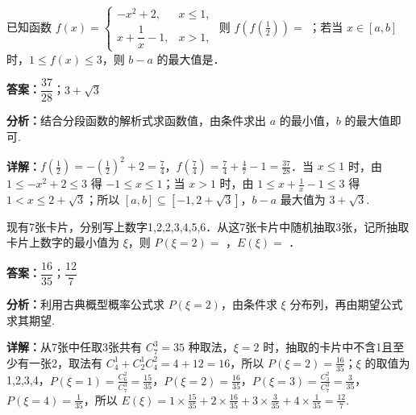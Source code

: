 \begin{question}[points=6]
已知函数 $f(x) = \begin{cases} -x^2+2, & x \le 1, \\ x+\dfrac{1}{x}-1, & x > 1, \end{cases}$ 则 $f\left(f\left(\frac{1}{2}\right)\right) =$ ；若当 $x \in [a,b]$ 时，$1 \le f(x) \le 3$，则 $b-a$ 的最大值是．
\begin{solution}
\textbf{答案：}$\dfrac{37}{28}$；$3+\sqrt{3}$

\textbf{分析：}结合分段函数的解析式求函数值，由条件求出 $a$ 的最小值，$b$ 的最大值即可.

\textbf{详解：}$f(\frac{1}{2}) = -(\frac{1}{2})^2+2 = \frac{7}{4}$，$f(\frac{7}{4}) = \frac{7}{4}+\frac{4}{7}-1 = \frac{37}{28}$．当 $x\le1$ 时，由 $1\le -x^2+2 \le 3$ 得 $-1\le x\le1$；当 $x>1$ 时，由 $1\le x+\frac{1}{x}-1\le 3$ 得 $1<x\le 2+\sqrt{3}$；所以 $[a,b]\subseteq[-1,2+\sqrt{3}]$，$b-a$ 最大值为 $3+\sqrt{3}$.
\end{solution}
\end{question}

\begin{question}[points=6]
现有7张卡片，分别写上数字1,2,2,3,4,5,6．从这7张卡片中随机抽取3张，记所抽取卡片上数字的最小值为 $\xi$，则 $P(\xi=2) =$ ，$E(\xi) =$ ．
\begin{solution}
\textbf{答案：}$\dfrac{16}{35}$；$\dfrac{12}{7}$

\textbf{分析：}利用古典概型概率公式求 $P(\xi=2)$，由条件求 $\xi$ 分布列，再由期望公式求其期望.

\textbf{详解：}从7张中任取3张共有 $C_7^3=35$ 种取法，$\xi=2$ 时，抽取的卡片中不含1且至少有一张2，取法有 $C_4^1 + C_2^1 C_4^2 = 4+12=16$，所以 $P(\xi=2)=\frac{16}{35}$；$\xi$ 的取值为1,2,3,4，$P(\xi=1)=\frac{C_6^2}{C_7^3}=\frac{15}{35}$，$P(\xi=2)=\frac{16}{35}$，$P(\xi=3)=\frac{C_3^2}{C_7^3}=\frac{3}{35}$，$P(\xi=4)=\frac{1}{35}$，所以 $E(\xi)=1\times\frac{15}{35}+2\times\frac{16}{35}+3\times\frac{3}{35}+4\times\frac{1}{35}=\frac{12}{7}$.
\end{solution}
\end{question}

